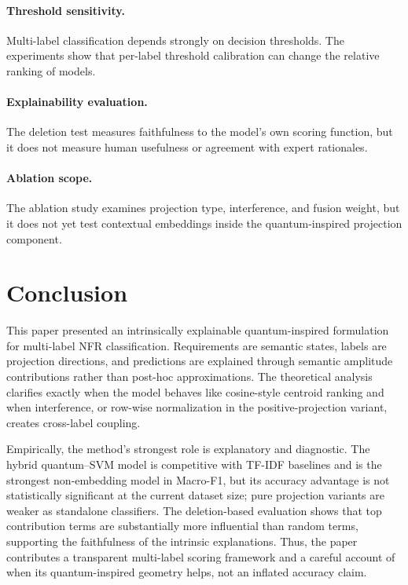 \documentclass[runningheads]{llncs}
\begin{document}
\paragraph{Threshold sensitivity.} Multi-label classification depends strongly on
decision thresholds. The experiments show that per-label threshold calibration
can change the relative ranking of models.

\paragraph{Explainability evaluation.} The deletion test measures faithfulness to
the model's own scoring function, but it does not measure human usefulness or
agreement with expert rationales.

\paragraph{Ablation scope.} The ablation study examines projection type,
interference, and fusion weight, but it does not yet test contextual embeddings
inside the quantum-inspired projection component.

\section{Conclusion}
This paper presented an intrinsically explainable quantum-inspired formulation
for multi-label NFR classification. Requirements are semantic states, labels
are projection directions, and predictions are explained through semantic
amplitude contributions rather than post-hoc approximations. The theoretical
analysis clarifies exactly when the model behaves like cosine-style centroid
ranking and when interference, or row-wise normalization in the
positive-projection variant, creates cross-label coupling.

Empirically, the method's strongest role is explanatory and diagnostic. The
hybrid quantum--SVM model is competitive with TF-IDF baselines and is the
strongest non-embedding model in Macro-F1, but its accuracy advantage is not
statistically significant at the current dataset size; pure projection variants
are weaker as standalone classifiers. The deletion-based evaluation shows that
top contribution terms are substantially more influential than random terms,
supporting the faithfulness of the intrinsic explanations. Thus, the paper
contributes a transparent multi-label scoring framework and a careful account
of when its quantum-inspired geometry helps, not an inflated accuracy claim.
\end{document}
